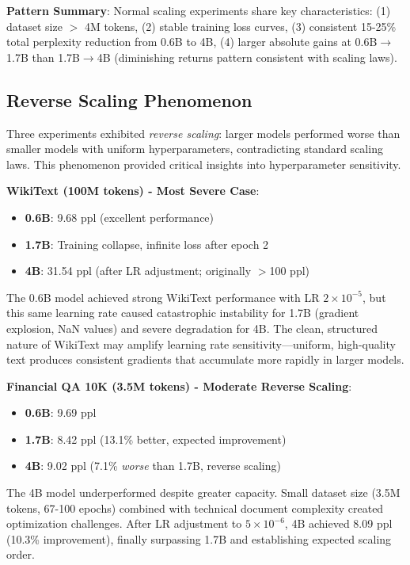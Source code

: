 \textbf{Pattern Summary}: Normal scaling experiments share key characteristics: (1) dataset size $>$ 4M tokens, (2) stable training loss curves, (3) consistent 15-25\% total perplexity reduction from 0.6B to 4B, (4) larger absolute gains at 0.6B$\to$1.7B than 1.7B$\to$4B (diminishing returns pattern consistent with scaling laws).

\subsection{Reverse Scaling Phenomenon}

Three experiments exhibited \textit{reverse scaling}: larger models performed worse than smaller models with uniform hyperparameters, contradicting standard scaling laws. This phenomenon provided critical insights into hyperparameter sensitivity.

\textbf{WikiText (100M tokens) - Most Severe Case}:
\begin{itemize}
\item \textbf{0.6B}: 9.68 ppl (excellent performance)
\item \textbf{1.7B}: Training collapse, infinite loss after epoch 2
\item \textbf{4B}: 31.54 ppl (after LR adjustment; originally $>$100 ppl)
\end{itemize}

The 0.6B model achieved strong WikiText performance with LR $2 \times 10^{-5}$, but this same learning rate caused catastrophic instability for 1.7B (gradient explosion, NaN values) and severe degradation for 4B. The clean, structured nature of WikiText may amplify learning rate sensitivity---uniform, high-quality text produces consistent gradients that accumulate more rapidly in larger models.

\textbf{Financial QA 10K (3.5M tokens) - Moderate Reverse Scaling}:
\begin{itemize}
\item \textbf{0.6B}: 9.69 ppl
\item \textbf{1.7B}: 8.42 ppl (13.1\% better, expected improvement)
\item \textbf{4B}: 9.02 ppl (7.1\% \textit{worse} than 1.7B, reverse scaling)
\end{itemize}

The 4B model underperformed despite greater capacity. Small dataset size (3.5M tokens, 67-100 epochs) combined with technical document complexity created optimization challenges. After LR adjustment to $5 \times 10^{-6}$, 4B achieved 8.09 ppl (10.3\% improvement), finally surpassing 1.7B and establishing expected scaling order.

